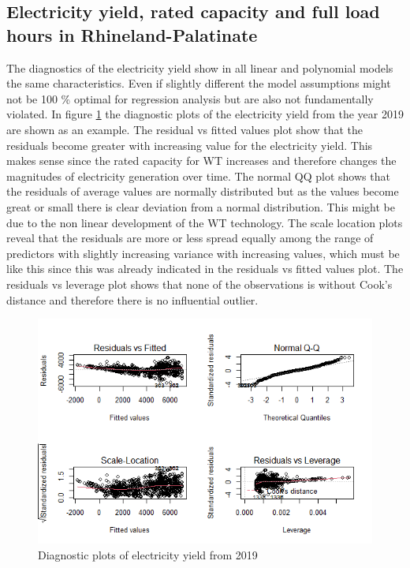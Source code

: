 \documentclass[a4paper,11pt]{article}
\begin{document}
\hypertarget{electricity-yield-rated-capacity-and-full-load-hours-in-rhineland-palatinate}{%
\subsection{Electricity yield, rated capacity and full load hours in Rhineland-Palatinate}\label{electricity-yield-rated-capacity-and-full-load-hours-in-rhineland-palatinate}}

The diagnostics of the electricity yield show in all linear and polynomial models the same characteristics. Even if slightly different the model assumptions might not be 100 \% optimal for regression analysis but are also not fundamentally violated. In figure \ref{fig:diagnostic} the diagnostic plots of the electricity yield from the year 2019 are shown as an example. The residual vs fitted values plot show that the residuals become greater with increasing value for the electricity yield. This makes sense since the rated capacity for WT increases and therefore changes the magnitudes of electricity generation over time. The normal QQ plot shows that the residuals of average values are normally distributed but as the values become great or small there is clear deviation from a normal distribution. This might be due to the non linear development of the WT technology. The scale location plots reveal that the residuals are more or less spread equally among the range of predictors with slightly increasing variance with increasing values, which must be like this since this was already indicated in the residuals vs fitted values plot. The residuals vs leverage plot shows that none of the observations is without Cook's distance and therefore there is no influential outlier.
\begin{figure}

{\centering \includegraphics[width=1\linewidth]{data/Amprion/results_of_analysis/diagnostic} 

}

\caption{Diagnostic plots of electricity yield from 2019}\label{fig:diagnostic}
\end{figure}
\end{document}
